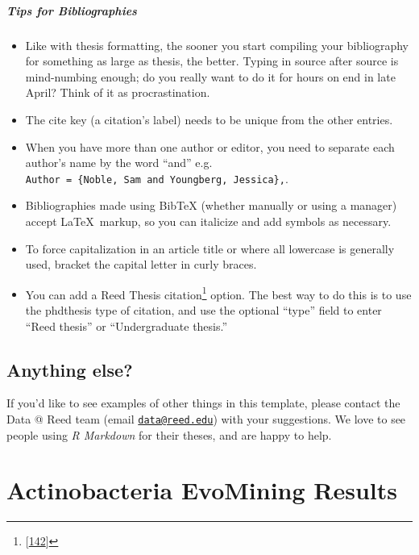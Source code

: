 \documentclass[12pt,twoside]{reedthesis}
\providecommand{\tightlist}{%
  \setlength{\itemsep}{0pt}\setlength{\parskip}{0pt}}
\begin{document}
  \paragraph{Tips for Bibliographies}\label{tips-for-bibliographies}
  
  \begin{itemize}
  \tightlist
  \item
    Like with thesis formatting, the sooner you start compiling your
    bibliography for something as large as thesis, the better. Typing in
    source after source is mind-numbing enough; do you really want to do
    it for hours on end in late April? Think of it as procrastination.
  \item
    The cite key (a citation's label) needs to be unique from the other
    entries.
  \item
    When you have more than one author or editor, you need to separate
    each author's name by the word ``and'' e.g.
    \texttt{Author\ =\ \{Noble,\ Sam\ and\ Youngberg,\ Jessica\},}.
  \item
    Bibliographies made using BibTeX (whether manually or using a manager)
    accept \LaTeX~markup, so you can italicize and add symbols as
    necessary.
  \item
    To force capitalization in an article title or where all lowercase is
    generally used, bracket the capital letter in curly braces.
  \item
    You can add a Reed Thesis citation\footnote{{[}\protect\hyperlink{ref-noble2002}{142}{]}}
    option. The best way to do this is to use the phdthesis type of
    citation, and use the optional ``type'' field to enter ``Reed thesis''
    or ``Undergraduate thesis.''
  \end{itemize}
  
  \section{Anything else?}\label{anything-else}
  
  If you'd like to see examples of other things in this template, please
  contact the Data @ Reed team (email
  \href{mailto:data@reed.edu}{\nolinkurl{data@reed.edu}}) with your
  suggestions. We love to see people using \emph{R Markdown} for their
  theses, and are happy to help.
  
  \hypertarget{refux5flabels}{\chapter{Actinobacteria EvoMining
  Results}\label{refux5flabels}}
  
\end{document}
